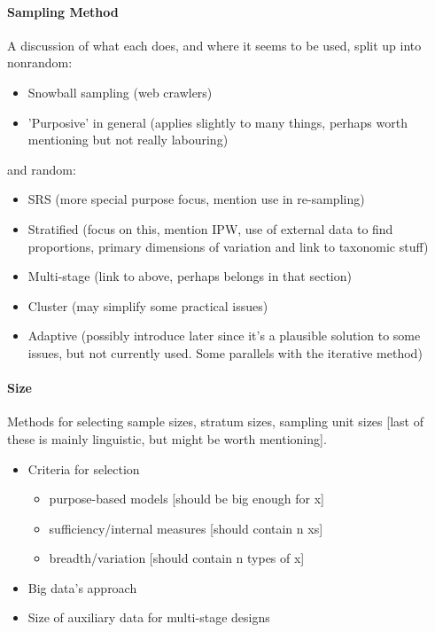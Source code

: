 \paragraph{Sampling Method}
A discussion of what each does, and where it seems to be used, split up into nonrandom:

\begin{itemize}
 \item Snowball sampling (web crawlers)
 \item 'Purposive' in general (applies slightly to many things, perhaps worth mentioning but not really labouring)
\end{itemize}

and random:

\begin{itemize}
 \item SRS (more special purpose focus, mention use in re-sampling)
 \item Stratified (focus on this, mention IPW, use of external data to find proportions, primary dimensions of variation and link to taxonomic stuff)
 \item Multi-stage (link to above, perhaps belongs in that section)
 \item Cluster (may simplify some practical issues)
 \item Adaptive (possibly introduce later since it's a plausible solution to some issues, but not currently used.  Some parallels with the iterative method)
\end{itemize}


\paragraph{Size}
Methods for selecting sample sizes, stratum sizes, sampling unit sizes [last of these is mainly linguistic, but might be worth mentioning].

\begin{itemize}
 \item Criteria for selection
    \begin{itemize}
    \item purpose-based models [should be big enough for x]
    \item sufficiency/internal measures [should contain n xs]
    \item breadth/variation [should contain n types of x]
    \end{itemize}
 \item Big data's approach
 \item Size of auxiliary data for multi-stage designs
\end{itemize}


